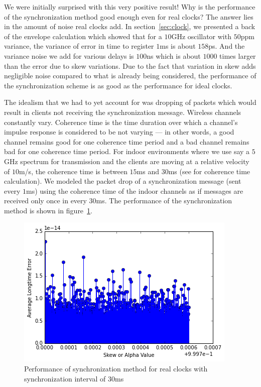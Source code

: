 \documentclass[10pt, journal, letter, onecolumn]{IEEEtran}
\begin{document}
\begin{figure}
\centering

\end{figure}

We were initially surprised with this very positive result! Why is the performance of the synchronization method good enough even for real clocks? The answer lies in the amount of noise real clocks add. In section~\ref{sec:clock}, we presented a back of the envelope calculation which showed that for a $10$GHz oscillator with $50$ppm variance, the variance of error in time to register $1$ms is about $158$ps. And the variance noise we add for various delays is $100$ns which is about $1000$ times larger than the error due to skew variations. Due to the fact that variation in skew adds negligible noise compared to what is already being considered, the performance of the synchronization scheme is as good as the performance for ideal clocks.

The idealism that we had to yet account for was dropping of packets which would result in clients not receiving the synchronization message. Wireless channels constantly vary. Coherence time is the time duration over which a channel's impulse response is considered to be not varying --- in other words, a good channel remains good for one coherence time period and a bad channel remains bad for one coherence time period. For indoor environments where we use say a $5$GHz spectrum for transmission and the clients are moving at a relative velocity of $10$m/s, the coherence time is between $15$ms and $30$ms (see \cite{Tse:2005:FWC:1111206} for coherence time calculation). We modeled the packet drop of a synchronization message (sent every $1$ms) using the coherence time of the indoor channels as if messages are received only once in every $30$ms. The performance of the synchronization method is shown in figure~\ref{fig:real_30ms}.

\begin{figure}[h]
\centering
\includegraphics[scale = 0.5]{figures/real_30ms}
\caption{Performance of synchronization method for real clocks with synchronization interval of $30$ms}
\label{fig:real_30ms}
\end{figure}
\end{document}
